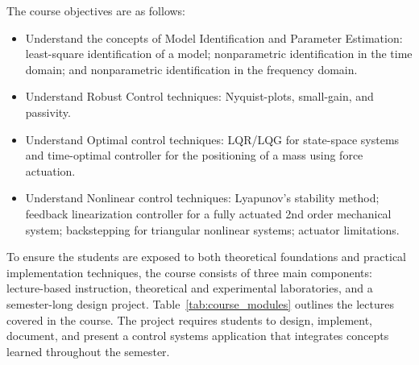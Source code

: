 \documentclass[journal]{IEEEtran}
\begin{document}
The course objectives are as follows:
\begin{itemize}
    \item Understand the concepts of Model Identification and Parameter Estimation: least-square identification of a %
    model; nonparametric identification in the time domain; and nonparametric identification in the frequency domain.
    \item Understand Robust Control techniques: Nyquist-plots, small-gain, and passivity.
    \item Understand Optimal control techniques: LQR/LQG for state-space systems and time-optimal controller for the positioning of a mass using force actuation.
    \item Understand Nonlinear control techniques: Lyapunov's stability method; feedback linearization controller for a fully actuated 2nd order mechanical system; backstepping for triangular nonlinear systems; actuator limitations.
\end{itemize}
To ensure the students are exposed to both theoretical foundations and practical implementation techniques, the course consists of three main components: lecture-based instruction, theoretical and experimental laboratories, and a semester-long design project. 
Table~\ref{tab:course_modules} outlines the lectures covered in the course. %
The project requires students to design, implement, document, and present a control systems application that integrates concepts learned throughout the semester. 
\end{document}
